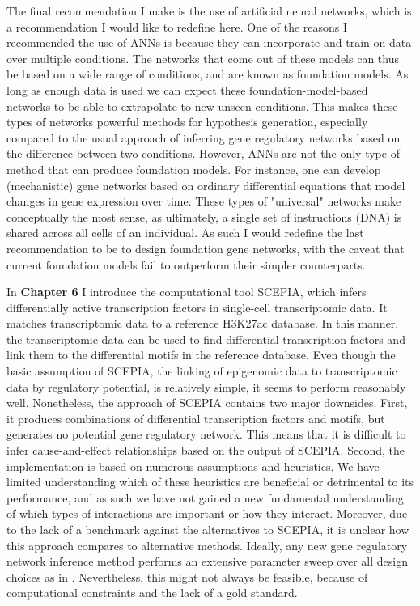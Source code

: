The final recommendation I make is the use of artificial neural networks, which is a recommendation I would like to redefine here. One of the reasons I recommended the use of ANNs is because they can incorporate and train on data over multiple conditions. The networks that come out of these models can thus be based on a wide range of conditions, and are known as foundation models. As long as enough data is used we can expect these foundation-model-based networks to be able to extrapolate to new unseen conditions\cite{Schreiber2020_avocado}. This makes these types of networks powerful methods for hypothesis generation, especially compared to the usual approach of inferring gene regulatory networks based on the difference between two conditions. However, ANNs are not the only type of method that can produce foundation models. For instance, one can develop (mechanistic) gene networks based on ordinary differential equations that model changes in gene expression over time\cite{Ventre_2022}. These types of "universal" networks make conceptually the most sense, as ultimately, a single set of instructions (DNA) is shared across all cells of an individual. As such I would redefine the last recommendation to be to design foundation gene networks, with the caveat that current foundation models fail to outperform their simpler counterparts\cite{Kedzierska2023}.

In \textbf{Chapter 6} I introduce the computational tool SCEPIA, which infers differentially active transcription factors in single-cell transcriptomic data. It matches transcriptomic data to a reference H3K27ac database. In this manner, the transcriptomic data can be used to find differential transcription factors and link them to the differential motifs in the reference database. Even though the basic assumption of SCEPIA, the linking of epigenomic data to transcriptomic data by regulatory potential\cite{Wang2016}, is relatively simple, it seems to perform reasonably well. Nonetheless, the approach of SCEPIA contains two major downsides. First, it produces combinations of differential transcription factors and motifs, but generates no potential gene regulatory network. This means that it is difficult to infer cause-and-effect relationships based on the output of SCEPIA. Second, the implementation is based on numerous assumptions and heuristics. We have limited understanding which of these heuristics are beneficial or detrimental to its performance, and as such we have not gained a new fundamental understanding of which types of interactions are important or how they interact. Moreover, due to the lack of a benchmark against the alternatives to SCEPIA\cite{Aibar_2017,Dong2022}, it is unclear how this approach compares to alternative methods. Ideally, any new gene regulatory network inference method performs an extensive parameter sweep over all design choices as in \cite{Gschwind2023}. Nevertheless, this might not always be feasible, because of computational constraints and the lack of a gold standard.

